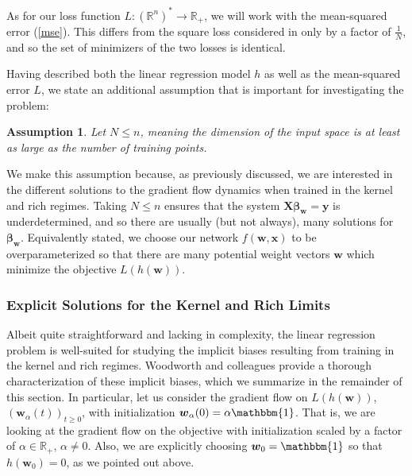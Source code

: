 \documentclass{article}
\newtheorem*{assumption}{Assumption}
\begin{document}
As for our loss function $L: (\mathbb{R}^n)^* \rightarrow \mathbb{R}_+$, we will work with the mean-squared error (\ref{mse}). This differs from the square loss considered in \cite{woodworth2020kernel} only by a factor of $\frac{1}{N}$, and so the set of minimizers of the two losses is identical.

Having described both the linear regression model $h$ as well as the mean-squared error $L$, we state an additional assumption that is important for investigating the problem:
\begin{assumption}
Let $N \leq n$, meaning the dimension of the input space is at least as large as the number of training points.
\end{assumption}
We make this assumption because, as previously discussed, we are interested in the different solutions to the gradient flow dynamics when trained in the kernel and rich regimes. Taking $N \leq n$ ensures that the system $\boldsymbol{X}\boldsymbol{\beta}_{\boldsymbol{w}} = \boldsymbol{y}$ is underdetermined, and so there are usually (but not always), many solutions for $\boldsymbol{\beta}_{\boldsymbol{w}}$. Equivalently stated, we choose our network $f(\boldsymbol{w}, \boldsymbol{x})$ to be overparameterized so that there are many potential weight vectors $\boldsymbol{w}$ which minimize the objective $L(h(\boldsymbol{w}))$.

\subsubsection{Explicit Solutions for the Kernel and Rich Limits}
Albeit quite straightforward and lacking in complexity, the linear regression problem is well-suited for studying the implicit biases resulting from training in the kernel and rich regimes. Woodworth and colleagues provide a thorough characterization of these implicit biases, which we summarize in the remainder of this section. In particular, let us consider the gradient flow on $L(h(\boldsymbol{w}))$, $(\boldsymbol{w}_{\alpha}(t))_{t \geq 0}$, with initialization $\boldsymbol{w}_{\alpha}(0) = \alpha \mathbbm{1}$. That is, we are looking at the gradient flow on the objective with initialization scaled by a factor of $\alpha \in \mathbb{R}_+$, $\alpha \neq 0$. Also, we are explicitly choosing $\boldsymbol{w}_0 = \mathbbm{1}$ so that $h(\boldsymbol{w}_0) = 0$, as we pointed out above.
\end{document}
